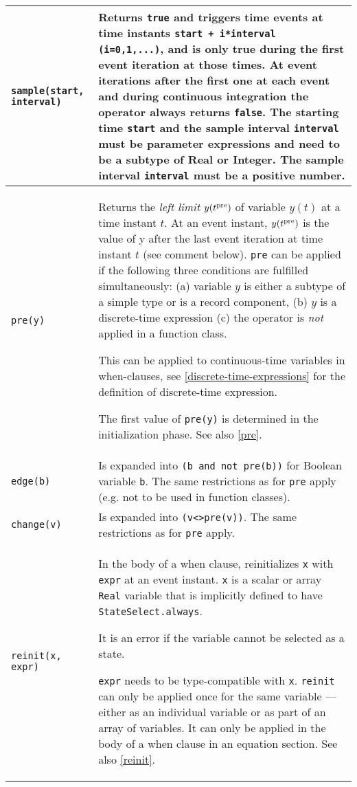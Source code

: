 \begin{longtable}{|p{5cm}|p{8cm}|}
\lstinline!sample(start, interval)! & Returns \lstinline!true! and triggers time events at time
instants \lstinline!start + i*interval (i=0,1,...)!, and is only true during the first event iteration at those times.
At event iterations after the first one at each event and during continuous integration
the operator always returns \lstinline!false!. The starting time \lstinline!start! and the
sample interval \lstinline!interval! must be parameter expressions and need to be
a subtype of Real or Integer. The sample interval \lstinline!interval! must be a
positive number.\\ \hline

\lstinline!pre(y)! & Returns the \emph{left limit} $y(t\textsuperscript{pre})$ of
variable $y(t)$ at a time instant $t$. At an event instant,
$y(t\textsuperscript{pre})$ is the value of y after the last event
iteration at time instant $t$ (see comment below). \lstinline!pre! can
be applied if the following three conditions are fulfilled
simultaneously: (a) variable $y$ is either a subtype of a simple type or
is a record component, (b) $y$ is a discrete-time expression (c) the
operator is \emph{not} applied in a function class.
\begin{nonnormative}
This can be applied to continuous-time variables in when-clauses, see \autoref{discrete-time-expressions} for the definition of discrete-time expression.
\end{nonnormative}
The first value of \lstinline!pre(y)! is determined in the initialization phase. See
also \autoref{pre}.\\ \hline

\lstinline!edge(b)! & Is expanded into \lstinline!(b and not pre(b))! for Boolean variable
\lstinline!b!. The same restrictions as for \lstinline!pre! apply (e.g. not to be
used in function classes).\\ \hline

\lstinline!change(v)! & Is expanded into \lstinline!(v<>pre(v))!. The same restrictions as for \lstinline!pre! apply.\\ \hline

\lstinline!reinit(x, expr)! & In the body of a when clause, reinitializes \lstinline!x! with
\lstinline!expr! at an event instant. \lstinline!x! is a scalar or array \lstinline!Real! variable that is implicitly defined to have \lstinline!StateSelect.always!.
\begin{nonnormative}
It is an error if the variable cannot be selected as a state.
\end{nonnormative}
\lstinline!expr! needs to be type-compatible with \lstinline!x!.
\lstinline!reinit! can only be applied once for the same variable --- either
as an individual variable or as part of an array of variables. It can
only be applied in the body of a when clause in an equation section. See
also \autoref{reinit}.\\ \hline

\end{longtable}

